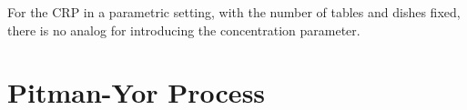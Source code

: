 
For the CRP in a parametric setting, with the number of tables and dishes fixed, there is no analog for introducing the concentration parameter.




\section{Pitman-Yor Process}
